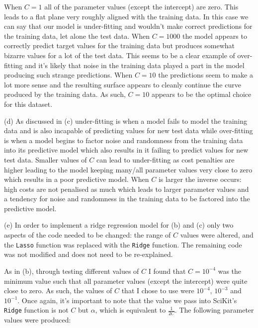 \documentclass[12pt]{article}
\begin{document}
When $C = 1$ all of the parameter values (except the intercept) are zero. This leads to a flat plane very roughly aligned with the training data. In this case we can say that our model is under-fitting and wouldn't make correct predictions for the training data, let alone the test data. When $C = 1000$ the model appears to correctly predict target values for the training data but produces somewhat bizarre values for a lot of the test data. This seems to be a clear example of over-fitting and it's likely that noise in the training data played a part in the model producing such strange predictions. When $C = 10$ the predictions seem to make a lot more sense and the resulting surface appears to cleanly continue the curve produced by the training data. As such, $C = 10$ appears to be the optimal choice for this dataset.

\noindent (d) As discussed in (c) under-fitting is when a model fails to model the training data and is also incapable of predicting values for new test data while over-fitting is when a model begins to factor noise and randomness from the training data into its predictive model which also results in it failing to predict values for new test data. Smaller values of $C$ can lead to under-fitting as cost penalties are higher leading to the model keeping many/all parameter values very close to zero which results in a poor predictive model. When $C$ is larger the inverse occurs: high costs are not penalised as much which leads to larger parameter values and a tendency for noise and randomness in the training data to be factored into the predictive model.

\noindent (e) In order to implement a ridge regression model for (b) and (c) only two aspects of the code needed to be changed: the range of $C$ values were altered, and the \texttt{Lasso} function was replaced with the \texttt{Ridge} function. The remaining code was not modified and does not need to be re-explained.

As in (b), through testing different values of $C$ I found that $C = 10^{-4}$ was the minimum value such that all parameter values (except the intercept) were quite close to zero. As such, the values of $C$ that I chose to use were $10^{-4}$, $10^{-3}$ and $10^{-1}$. Once again, it's important to note that the value we pass into SciKit's \texttt{Ridge} function is not $C$ but $\alpha$, which is equivalent to $\frac{1}{2C}$. The following parameter values were produced:
\end{document}
